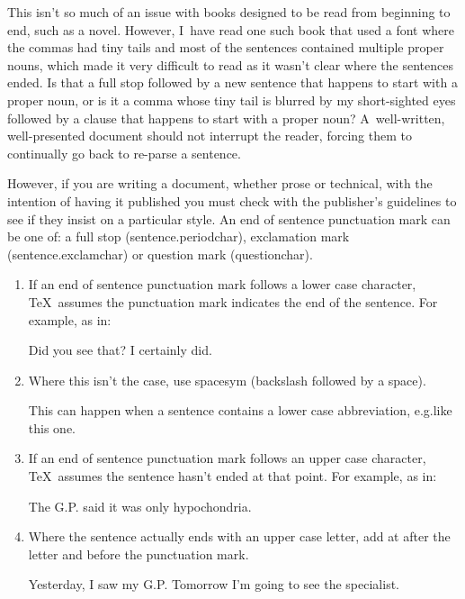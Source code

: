 This isn't so much of an issue with books designed to be read from
beginning to end, such as a novel. However, I~have read one such
book that used a font where the commas had tiny tails and most of
the sentences contained multiple proper nouns, which made it very
difficult to read as it wasn't clear where the sentences ended. Is
that a full stop followed by a new sentence that happens to start
with a proper noun, or is it a comma whose tiny tail is blurred by
my short-sighted eyes followed by a clause that happens to start
with a proper noun? A~well-written, well-presented document should
not interrupt the reader, forcing them to continually go back to
re-parse a sentence.

However, if you are writing a document, whether prose or technical,
with the intention of having it published you must check with the
publisher's guidelines to see if they insist on a particular style.
An end of sentence punctuation mark can be one of: a full stop
(\gls{sentence.periodchar}), exclamation mark
(\gls{sentence.exclamchar}) or question mark (\gls{questionchar}).

\begin{enumerate}
\item If an end of sentence punctuation mark follows a lower case
character, \TeX\ assumes the punctuation mark indicates the end of
the sentence. For example, as in:
\begin{codeS}
Did you see that? I certainly did.
\end{codeS}

\item Where this isn't the case, use \gls{spacesym} (backslash
followed by a space).
\begin{code}
This can happen when a sentence contains
a lower case abbreviation, e.g.like this
one.
\end{code}

\item If an end of sentence punctuation mark follows an upper case
character, \TeX\ assumes the sentence hasn't ended at that point.
For example, as in:
\begin{codeS}
The G.P. said it was only hypochondria.
\end{codeS}

\item Where the sentence actually ends with an upper case letter,
add \gls{at} after the letter and before the punctuation mark.
\begin{code}
Yesterday, I saw my G.P. Tomorrow I'm going to see the
specialist.
\end{code}

\end{enumerate}

